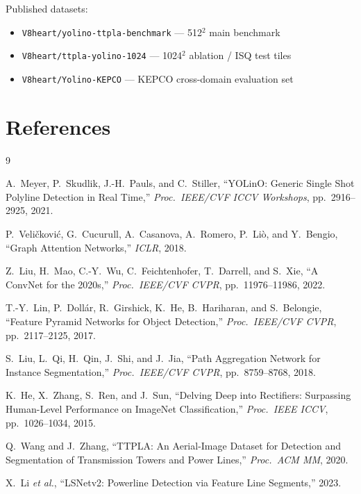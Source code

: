 \documentclass[11pt,a4paper]{article}
\begin{document}
Published datasets:
\begin{itemize}[leftmargin=*]
  \item \texttt{V8heart/yolino-ttpla-benchmark} --- 512$^2$ main benchmark
  \item \texttt{V8heart/ttpla-yolino-1024} --- 1024$^2$ ablation / ISQ test tiles
  \item \texttt{V8heart/Yolino-KEPCO} --- KEPCO cross-domain evaluation set
\end{itemize}

\section*{References}

\begin{thebibliography}{9}

A.\ Meyer, P.\ Skudlik, J.-H.\ Pauls, and C.\ Stiller,
``YOLinO: Generic Single Shot Polyline Detection in Real Time,''
\textit{Proc.\ IEEE/CVF ICCV Workshops}, pp.\ 2916--2925, 2021.

P.\ Veli\v{c}kovi\'{c}, G.\ Cucurull, A.\ Casanova, A.\ Romero,
P.\ Li\`{o}, and Y.\ Bengio,
``Graph Attention Networks,''
\textit{ICLR}, 2018.

Z.\ Liu, H.\ Mao, C.-Y.\ Wu, C.\ Feichtenhofer, T.\ Darrell, and S.\ Xie,
``A ConvNet for the 2020s,''
\textit{Proc.\ IEEE/CVF CVPR}, pp.\ 11976--11986, 2022.

T.-Y.\ Lin, P.\ Doll\'{a}r, R.\ Girshick, K.\ He, B.\ Hariharan, and S.\ Belongie,
``Feature Pyramid Networks for Object Detection,''
\textit{Proc.\ IEEE/CVF CVPR}, pp.\ 2117--2125, 2017.

S.\ Liu, L.\ Qi, H.\ Qin, J.\ Shi, and J.\ Jia,
``Path Aggregation Network for Instance Segmentation,''
\textit{Proc.\ IEEE/CVF CVPR}, pp.\ 8759--8768, 2018.

K.\ He, X.\ Zhang, S.\ Ren, and J.\ Sun,
``Delving Deep into Rectifiers: Surpassing Human-Level Performance on ImageNet Classification,''
\textit{Proc.\ IEEE ICCV}, pp.\ 1026--1034, 2015.

Q.\ Wang and J.\ Zhang,
``TTPLA: An Aerial-Image Dataset for Detection and Segmentation of Transmission Towers and Power Lines,''
\textit{Proc.\ ACM MM}, 2020.

X.\ Li \textit{et al.},
``LSNetv2: Powerline Detection via Feature Line Segments,''
2023.

\end{thebibliography}
\end{document}
